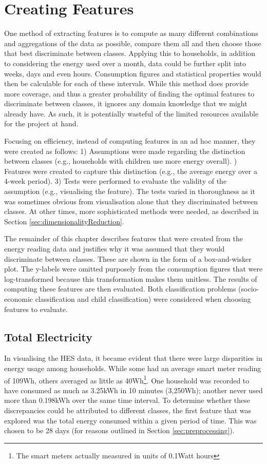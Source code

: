 \qqPlot


\section{Creating Features}
\label{sec:creatingFeatures}
One method of extracting features is to compute as many different combinations and aggregations of the data as possible, compare them all and then choose those that best discriminate between classes. Applying this to households, in addition to considering the energy used over a month, data could be further split into weeks, days and even hours. Consumption figures and statistical properties would then be calculable for each of these intervals. While this method does provide more coverage, and thus a greater probability of finding the optimal features to discriminate between classes, it ignores any domain knowledge that we might already have. As such, it is potentially wasteful of the limited resources available for the project at hand. 

Focusing on efficiency, instead of computing features in an ad hoc manner, they were created as follows:  1) Assumptions were made regarding the distinction between classes (e.g., households with children use more energy overall). ) Features were created to capture this distinction (e.g., the average energy over a 4-week period).  3) Tests were performed to evaluate the validity of the assumption (e.g., visualising the feature). The tests varied in thoroughness as it was sometimes obvious from visualisation alone that they discriminated between classes. At other times, more sophisticated methods were needed, as described in Section \ref{sec:dimensionalityReduction}. %

The remainder of this chapter describes features that were created from the energy reading data and justifies why it was assumed that they would discriminate between classes. These are shown in the form of a box-and-wisker plot. The y-labels were omitted purposely from the consumption figures that were log-transformed because this transformation makes them unitless. The results of computing these features are then evaluated. Both classification problems (socio-economic classification and child classification) were considered when choosing features to evaluate.

\subsection*{Total Electricity}
In visualising the HES data, it became evident that there were large disparities in energy usage among households. While some had an average smart meter reading of 109Wh, others averaged as little as 40Wh\footnote{The smart meters actually measured in units of 0.1Watt hours}. One household was recorded to have consumed as much as 3.25kWh in 10 minutes (3,250Wh); another never used more than 0.198kWh over the same time interval. To determine whether these discrepancies could be attributed to different classes, the first feature that was explored was the total energy consumed within a given period of time. This was chosen to be  28 days (for reasons outlined in Section \ref{sec:preprocessing}). 

